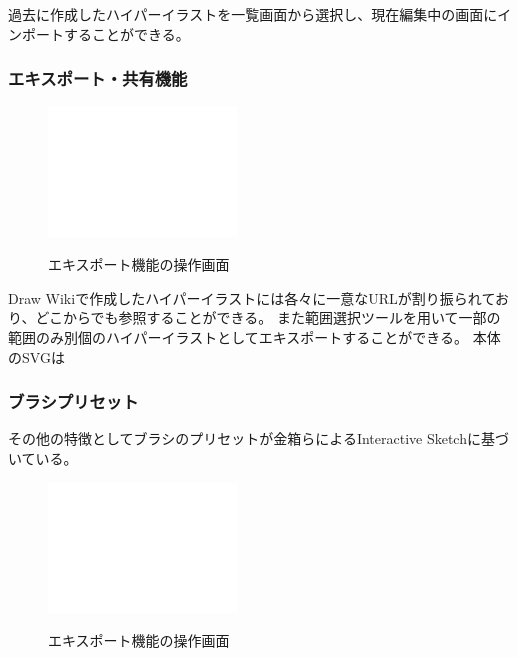 過去に作成したハイパーイラストを一覧画面から選択し、現在編集中の画面にインポートすることができる。

\subsubsection{エキスポート・共有機能}

\begin{figure}[htbp]
    \begin{center}
    {\includegraphics[width=50mm]{images/testimage.png}} \end{center}
    \caption{エキスポート機能の操作画面}
    \label{exporting}
\end{figure}

Draw Wikiで作成したハイパーイラストには各々に一意なURLが割り振られており、どこからでも参照することができる。
また範囲選択ツールを用いて一部の範囲のみ別個のハイパーイラストとしてエキスポートすることができる。
本体のSVGは

\subsubsection{ブラシプリセット}
その他の特徴としてブラシのプリセットが金箱らによるInteractive Sketch\cite{130004638060}に基づいている。


\begin{figure}[htbp]
    \begin{center}
    {\includegraphics[width=50mm]{images/testimage.png}} \end{center}
    \caption{エキスポート機能の操作画面}
    \label{interacive}
\end{figure}